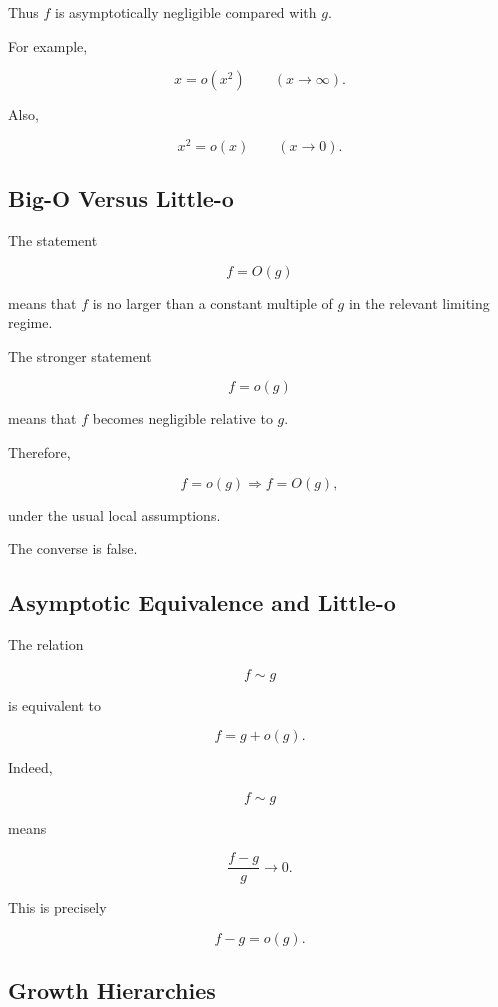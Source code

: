 Thus \(f\) is asymptotically negligible compared with \(g\).

For example,

\[
\boxed{
x=o(x^2)
\qquad
(x\to\infty).
}
\]

Also,

\[
\boxed{
x^2=o(x)
\qquad
(x\to0).
}
\]

\subsection{Big-O Versus Little-o}
\label{subsec:big-o-versus-little-o}

The statement

\[
f=O(g)
\]

means that \(f\) is no larger than a constant multiple of \(g\) in the
relevant limiting regime.

The stronger statement

\[
f=o(g)
\]

means that \(f\) becomes negligible relative to \(g\).

Therefore,

\[
\boxed{
f=o(g)
\Longrightarrow
f=O(g),
}
\]

under the usual local assumptions.

The converse is false.

\subsection{Asymptotic Equivalence and Little-o}
\label{subsec:equivalence-little-o}

The relation

\[
f\sim g
\]

is equivalent to

\[
\boxed{
f=g+o(g).
}
\]

Indeed,

\[
f\sim g
\]

means

\[
\frac{f-g}{g}\to0.
\]

This is precisely

\[
f-g=o(g).
\]

\subsection{Growth Hierarchies}
\label{subsec:asymptotic-growth-hierarchies}

